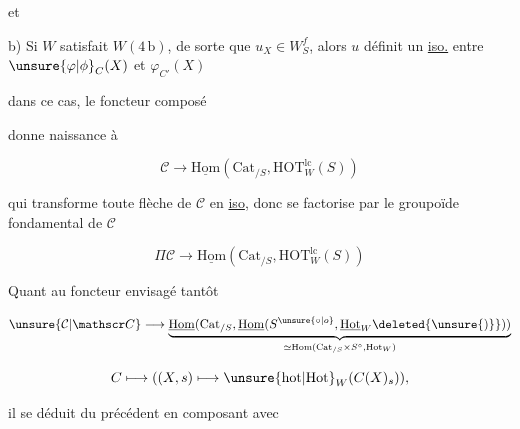 et

b) Si $W$ satisfait $W(4\,\mathrm b)$, de sorte que $u_X\in W_S^f$, alors $u$ définit un \uline{iso.} entre $\unsure{\varphi|\phi}_C(X)$ et $\varphi_{C'}(X)$


 dans ce cas, le foncteur composé


 donne naissance à

\[
\mathcal C\longrightarrow\underline{\mathrm{Hom}}(\mathrm{Cat}_{/S},\mathrm{HOT}^{\mathrm{lc}}_W(S))
\]

qui transforme toute flèche de $\mathcal C$ en \uline{iso}, donc se factorise par le groupoïde fondamental de $\mathcal C$

\[
\Pi\mathcal C\longrightarrow\underline{\mathrm{Hom}}(\mathrm{Cat}_{/S},\mathrm{HOT}^{\mathrm{lc}}_W(S))
\]

Quant au foncteur envisagé tantôt

\[
\unsure{\mathcal C|\mathscr C}\longrightarrow
\underbrace{\underline{\mathrm{Hom}}(\mathrm{Cat}_{/S},\underline{\mathrm{Hom}}(S^{\unsure{\circ|o}},\underline{\mathrm{Hot}}_W\deleted{\unsure{)}}))}_{\simeq\mathrm{Hom}(\mathrm{Cat}_{/S}\times S^\circ,\mathrm{Hot}_W)}
\]

\[
C\longmapsto ((X,s)\longmapsto\unsure{\mathrm{hot}|\mathrm{Hot}}_W(C(X)_s)),
\]

il se déduit du précédent en composant avec


